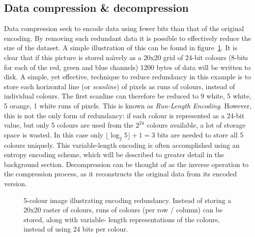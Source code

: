 \subsection{Data compression \& decompression}
Data compression seek to encode data using fewer bits than that of the original encoding. By removing such redundant data it is possible to effectively 
reduce the size of the dataset. A simple illustration of this can be found in figure~\ref{COMP_ILLUS}. It is clear that if this picture is stored na\"{\i}vely as a 20x20
grid of 24-bit colours (8-bits for each of the red, green and blue channels) 1200 bytes of data will be written to disk. A simple, yet effective, technique to 
reduce redundancy in this example is to store each horizontal line (or \textit{scanline}) of pixels as runs of colours, instead of individual colours. The first 
scanline can therefore be reduced to 9 white, 5 white, 5 orange, 1 white runs of pixels. This is known as \textit{Run-Length Encoding}. However, this is not the only 
form of redundancy: if each colour is represented as a 24-bit value, but only 5 colours are used from the $2^{24}$ colours available, a lot of storage space is wasted. 
In this case only  $\lfloor\log_{2}{5}\rfloor+1 = 3$ bits are needed to store all 5 colours uniquely. This variable-length encoding is often accomplished using an 
entropy encoding scheme, which will be described to greater detail in the background section. Decompression can be thought of as the inverse operation to the compression 
process, as it reconstructs the original data from its encoded version.
\begin{figure}[ht!]
\begin{mdframed}
  \centering
 \caption[Illustration of encoding redundancy]{5-colour image illustrating encoding redundancy. Instead of storing a 20x20 raster of colours, runs of colours (per row / column) can be stored, along with variable-
 length representations of the colours, instead of using 24 bits per colour.}
 \label{COMP_ILLUS}
\end{mdframed}
\end{figure}
